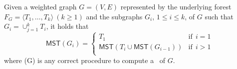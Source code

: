 
\begin{proposition} 
\label{prop:recursive_mst}
Given a weighted graph $G=(V,E)$ represented by the underlying forest 
$F_G = \langle T_1, \dots, T_k\rangle\ (k \ge 1)$ and the subgraphs $G_i$, $1\leq i\leq k$, of $G$ 
such that $G_i = \cup_{j=1}^kT_i$, it holds that
    \[
        \mathsf{MST}(G_i) =     \left\{ \begin{array}{lr}
				                    T_1& \mbox{if}\:\: i = 1 \\ 
				                    \mathsf{MST}(T_i \cup \mathsf{MST}(G_{i-1})) & \mbox{if}\:\: i > 1 \\
			                \end{array}\right.
    \]
where \mst(G) is any correct procedure to compute a \mst\ of $G$.
\end{proposition}

